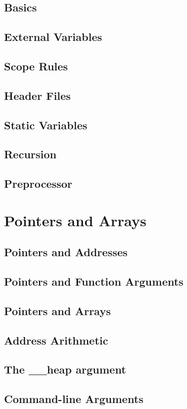 \documentclass{scrartcl}
\begin{document}
        \subsection{Basics}
        \subsection{External Variables}
        \subsection{Scope Rules}
        \subsection{Header Files}
        \subsection{Static Variables}
        \subsection{Recursion}
        \subsection{Preprocessor}
    \section{Pointers and Arrays}
        \subsection{Pointers and Addresses}
        \subsection{Pointers and Function Arguments}
        \subsection{Pointers and Arrays}
        \subsection{Address Arithmetic}
        \subsection{The \_\_heap argument}
        \subsection{Command-line Arguments}
\end{document}
